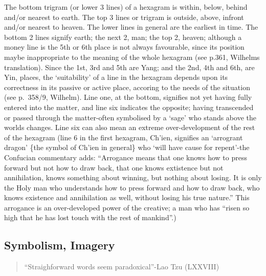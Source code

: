 \documentclass[11pt]{book}
\begin{document}
The bottom trigram (or lower 3 lines) of a hexagram is within, below, behind and/or nearest to earth. The top 3 lines or trigram is outside, above, infront and/or nearest to heaven. The lower lines in general are the earliest in time. The bottom 2 lines signify earth; the next 2, man; the top 2, heaven; although a money line is the 5th or 6th place is not always favourable, since its position maybe inappropriate to the meaning of the whole hexagram (see p.361, Wilhelms translation). Since the 1st, 3rd and 5th are Yang; and the 2nd, 4th and 6th, are Yin, places, the `suitability' of a line in the hexagram depends upon its correctness in its passive or active place, accoring to the needs of the situation (see p.~358/9, Wilhelm). Line one, at the bottom, signifies not yet having fully entered into the matter, and line six indicates the opposite; having transcended or passed through the matter-often symbolised by a `sage' who stands above the worlds changes. Line six can also mean an extreme over-development of the rest of the hexagram (line 6 in the first hexagram, Ch'ien, signifies an `arrogrant dragon' \{the symbol of Ch'ien in general\} who `will have cause for repent'-the Confucian commentary adds: ``Arrogance means that one knows how to press forward but not how to draw back, that one knows extistence but not annihilation, knows something about winning, but nothing about losing. It is only the Holy man who understands how to press forward and how to draw back, who knows existence and annihilation as well, without losing his true nature.'' This arrogance is an over-developed power of the creative; a man who has ``risen so high that he has lost touch with the rest of mankind''.)


\subsection{Symbolism, Imagery}

\begin{quote}
  ``Straighforward words seem paradoxical''-Lao Tzu (LXXVIII)
\end{quote}
\end{document}
